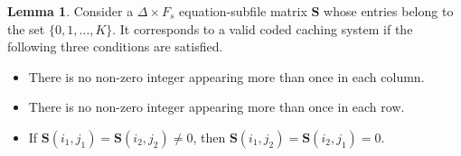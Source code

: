\documentclass[journal,twocolumn]{IEEEtran}
\theoremstyle{definition}
\newtheorem{lemma}{Lemma}
\newcommand{\calA}{\mathcal{A}}
\newcommand{\calE}{\mathcal{E}}
\newcommand{\bfS}{\mathbf{S}}
\begin{document}
\begin{lemma}
	\label{lemma:symmcache}
	Consider a $\Delta\times F_s$ equation-subfile matrix $\bfS$ whose entries belong to the set $\{0, 1, \dots, K\}$. It corresponds to a valid coded caching system if the following three conditions are satisfied.
	\begin{itemize}
		\item There is no non-zero integer appearing more than once in each column.
		\item There is no non-zero integer appearing more than once in each row.
		\item If $\bfS(i_1,j_1)=\bfS(i_2,j_2)\neq 0$, then $\bfS(i_1,j_2)=\bfS(i_2,j_1)=0$.
	\end{itemize}

\end{lemma}
\end{document}
